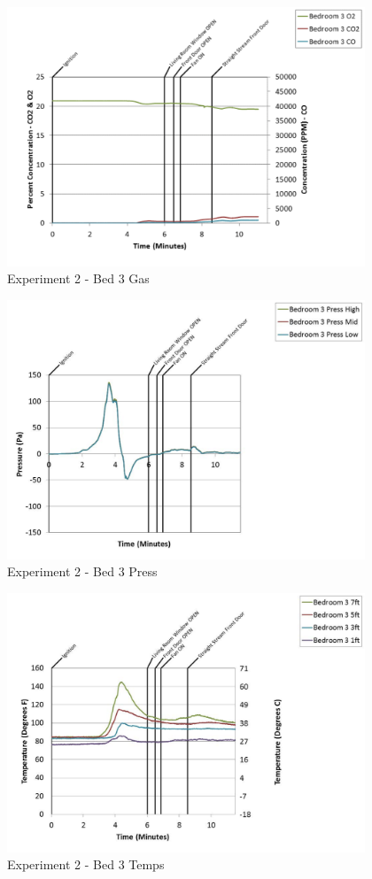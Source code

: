 \documentclass{article}
\begin{document}
\begin{appendices}
	\begin{figure}[h!]
		\centering
		\includegraphics[height=3.05in]{0_Images/Results_Charts/Exp_2_Charts/Bed3Gas.pdf}
		\caption{Experiment 2 - Bed 3 Gas}
	\end{figure}
 
	\clearpage

	\begin{figure}[h!]
		\centering
		\includegraphics[height=3.05in]{0_Images/Results_Charts/Exp_2_Charts/Bed3Press.pdf}
		\caption{Experiment 2 - Bed 3 Press}
	\end{figure}
 

	\begin{figure}[h!]
		\centering
		\includegraphics[height=3.05in]{0_Images/Results_Charts/Exp_2_Charts/Bed3Temps.pdf}
		\caption{Experiment 2 - Bed 3 Temps}
	\end{figure}
 

\end{appendices}
\end{document}
